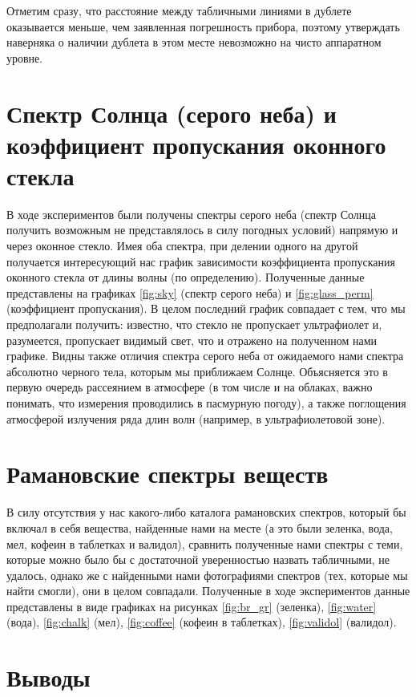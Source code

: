 \documentclass[a4paper, 12pt]{article}
\begin{document}
Отметим сразу, что расстояние между табличными линиями в дублете оказывается меньше, чем заявленная погрешность прибора, поэтому утверждать наверняка о наличии дублета в этом месте невозможно на чисто аппаратном уровне.




\section{Спектр Солнца (серого неба) и коэффициент пропускания оконного стекла}

В ходе экспериментов были получены спектры серого неба (спектр Солнца получить возможным не представлялось в силу погодных условий) напрямую и через оконное стекло. Имея оба спектра, при делении одного на другой получается интересующий нас график зависимости коэффициента пропускания оконного стекла от длины волны (по определению). Полученные данные представлены на графиках \ref{fig:sky} (спектр серого неба) и \ref{fig:glass_perm} (коэффициент пропускания). В целом последний график совпадает с тем, что мы предполагали получить: известно, что стекло не пропускает ультрафиолет и, разумеется, пропускает видимый свет, что и отражено на полученном нами графике. Видны также отличия спектра серого неба от ожидаемого нами спектра абсолютно черного тела, которым мы приближаем Солнце. Объясняется это в первую очередь рассеянием в атмосфере (в том числе и на облаках, важно понимать, что измерения проводились в пасмурную погоду), а также поглощения атмосферой излучения ряда длин волн (например, в ультрафиолетовой зоне).


\section{Рамановские спектры веществ}

В силу отсутствия у нас какого-либо каталога рамановских спектров, который бы включал в себя вещества, найденные нами на месте (а это были зеленка, вода, мел, кофеин в таблетках и валидол), сравнить полученные нами спектры с теми, которые можно было бы с достаточной уверенностью назвать табличными, не удалось, однако же с найденными нами фотографиями спектров (тех, которые мы найти смогли), они в целом совпадали. Полученные в ходе экспериментов данные представлены в виде графиках на рисунках \ref{fig:br_gr} (зеленка), \ref{fig:water} (вода), \ref{fig:chalk} (мел), \ref{fig:coffee} (кофеин в таблетках), \ref{fig:validol} (валидол).

\section{Выводы}
\end{document}
